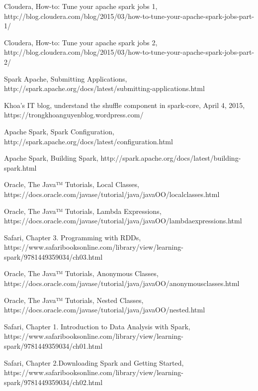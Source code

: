 \documentclass{report}
\begin{document}
{\begin{thebibliography}{9}
\textlatin{Cloudera, How-to: Tune your apache spark jobs 1, http://blog.cloudera.com/blog/2015/03/how-to-tune-your-apache-spark-jobs-part-1/}

\textlatin{Cloudera, How-to: Tune your apache spark jobs 2, http://blog.cloudera.com/blog/2015/03/how-to-tune-your-apache-spark-jobs-part-2/}

\textlatin{Spark Apache, Submitting Applications, http://spark.apache.org/docs/latest/submitting-applications.html}

\textlatin{Khoa's IT blog, understand the shuffle component in spark-core, April 4, 2015, https://trongkhoanguyenblog.wordpress.com/}

\textlatin{Apache Spark, Spark Configuration, http://spark.apache.org/docs/latest/configuration.html}

\textlatin{Apache Spark, Building Spark, http://spark.apache.org/docs/latest/building-spark.html}

\textlatin{Oracle, The Java™ Tutorials, Local Classes, https://docs.oracle.com/javase/tutorial/java/javaOO/localclasses.html}

\textlatin{Oracle, The Java™ Tutorials, Lambda Expressions, \\ https://docs.oracle.com/javase/tutorial/java/javaOO/lambdaexpressions.html}

\textlatin{Safari, Chapter 3. Programming with RDDs, https://www.safaribooksonline.com/library/view/learning-spark/9781449359034/ch03.html}

\textlatin{Oracle, The Java™ Tutorials, Anonymous Classes, \\ https://docs.oracle.com/javase/tutorial/java/javaOO/anonymousclasses.html}

\textlatin{Oracle, The Java™ Tutorials, Nested Classes, https://docs.oracle.com/javase/tutorial/java/javaOO/nested.html}



\textlatin{Safari, Chapter 1. Introduction to Data Analysis with Spark, https://www.safaribooksonline.com/library/view/learning-spark/9781449359034/ch01.html}

\textlatin{Safari, Chapter 2.Downloading Spark and Getting Started, https://www.safaribooksonline.com/library/view/learning-spark/9781449359034/ch02.html}


\end{thebibliography}}
\end{document}
